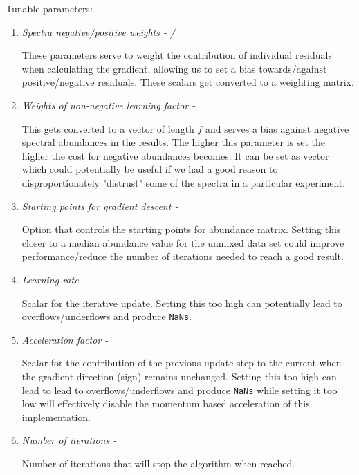  Tunable parameters:
 \begin{enumerate}
    \item \emph{Spectra negative/positive weights - / }

    
    These parameters serve to weight the contribution of individual residuals when calculating the gradient, allowing us to set a bias towards/against positive/negative residuals. These scalars get converted to a weighting matrix. 

    \item \emph{Weights of non-negative learning factor - } 

    
    This gets converted to a vector of length $f$ and serves a bias against negative spectral abundances in the results. The higher this parameter is set the higher the cost for negative abundances becomes. It can be set as vector which could potentially be useful if we had a good reason to disproportionately "distrust" some of the spectra in a particular experiment.

    \item \emph{Starting points for gradient descent - }

    
    Option that controls the starting points for abundance matrix. Setting this closer to a median abundance value for the unmixed data set could improve performance/reduce the number of iterations needed to reach a good result.

    \item \emph{Learning rate - } 

    
    Scalar for the iterative update. Setting this too high can potentially lead to overflows/underflows and produce \texttt{NaNs}.
    
    \item \emph{Acceleration factor  - }  

    Scalar for the contribution of the previous update step to the current when the gradient direction (sign) remains unchanged. Setting this too high can lead to lead to overflows/underflows and produce \texttt{NaNs} while setting it too low will effectively disable the momentum based acceleration of this implementation.
     
    \item \emph{Number of iterations - }
    
    Number of iterations that will stop the algorithm when reached. 
\end{enumerate}
